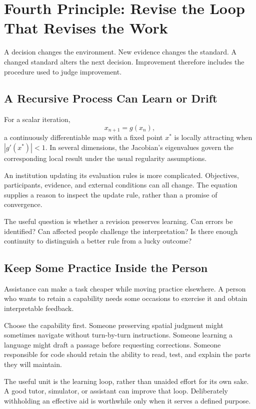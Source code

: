 \documentclass[11pt,openany]{book}
\begin{document}
\section{Fourth Principle: Revise the Loop That Revises the Work}

A decision changes the environment. New evidence changes the standard. A changed standard alters the next decision. Improvement therefore includes the procedure used to judge improvement.

\subsection{A Recursive Process Can Learn or Drift}

For a scalar iteration,
\begin{equation}
 x_{n+1}=g(x_n),
\end{equation}
a continuously differentiable map with a fixed point $x^\ast$ is locally attracting when $|g'(x^\ast)|<1$. In several dimensions, the Jacobian's eigenvalues govern the corresponding local result under the usual regularity assumptions.

An institution updating its evaluation rules is more complicated. Objectives, participants, evidence, and external conditions can all change. The equation supplies a reason to inspect the update rule, rather than a promise of convergence.

The useful question is whether a revision preserves learning. Can errors be identified? Can affected people challenge the interpretation? Is there enough continuity to distinguish a better rule from a lucky outcome?

\subsection{Keep Some Practice Inside the Person}

Assistance can make a task cheaper while moving practice elsewhere. A person who wants to retain a capability needs some occasions to exercise it and obtain interpretable feedback.

Choose the capability first. Someone preserving spatial judgment might sometimes navigate without turn-by-turn instructions. Someone learning a language might draft a passage before requesting corrections. Someone responsible for code should retain the ability to read, test, and explain the parts they will maintain.

The useful unit is the learning loop, rather than unaided effort for its own sake. A good tutor, simulator, or assistant can improve that loop. Deliberately withholding an effective aid is worthwhile only when it serves a defined purpose.
\end{document}
